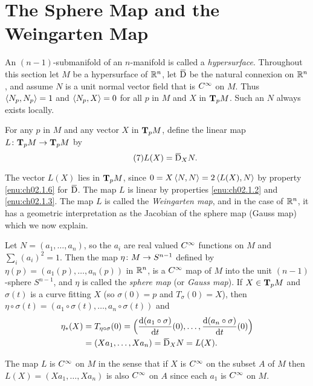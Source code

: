 \documentclass[../main]{subfiles}
\begin{document}

\section{The Sphere Map and the Weingarten Map}\label{ch02:s2}

An $(n-1)$-submanifold of an $n$-manifold is called a \emph{hypersurface}. Throughout this section let $M$ be a hypersurface of $\bR^n$, let $\covariant$ be the natural connexion on $\bR^n$, and assume $N$ is a unit normal vector field that is $\CInfty$ on $M$. Thus $\ip{N_p}{N_p}=1$ and $\ip{N_p}{X}=0$ for all $p$ in $M$ and $X$ in $\tangentspace{M}{p}$. Such an $N$ always exists locally.

For any $p$ in $M$ and any vector $X$ in $\tangentspace{M}{p}$, define the linear map \newline $L\colon \tangentspace{M}{p}\functionMaps \tangentspace{M}{p}$ by 
\begin{equation}\tag{7} \label{enu:ch02.2.7}
    L(X)=\covariant_X N.
\end{equation}

The vector $L(X)$ lies in $\tangentspace{M}{p}$, since $0=X\ip{N}{N}=2\ip{L(X)}{N}$ by property \ref{enu:ch02.1.6} for $\covariant$. The map $L$ is linear by properties \ref{enu:ch02.1.2} and \ref{enu:ch02.1.3}. The map $L$ is called the \emph{Weingarten map}, and in the case of $\bR^n$, it has a geometric interpretation as the Jacobian of the sphere map (Gauss map) which we now explain.

Let $N=(a_1,\dots,a_n)$, so the $a_i$ are real valued $\CInfty$ functions on $M$ and $\sum_i(a_i)^2=1$. Then the map $\eta\colon M\functionMaps S^{n-1}$ defined by $\eta(p)=(a_1(p),\dots,a_n(p))$ in $\bR^n$, is a $\CInfty$ map of $M$ into the unit $(n-1)$-sphere $S^{n-1}$, and $\eta$ is called the \emph{sphere map} (or \emph{Gauss map}). If $X \in \tangentspace{M}{p}$ and $\sigma(t)$ is a curve fitting $X$ (so $\sigma(0)=p$ and $T_{\sigma}(0)=X$), then $\eta\circ\sigma(t)=(a_1\circ\sigma(t),\dots,a_n\circ\sigma(t))$ and
\begin{align*}
    \eta_*(X)&=T_{\eta \circ \sigma }(0) = \Big(\dv{(a_1\circ\sigma)}{t}(0),\dots,\dv{(a_n\circ\sigma)}{t}(0)\Big)\\
    &=(Xa_1,\dots,Xa_n)=\covariant_XN=L(X).
\end{align*}

The map $L$ is $\CInfty$ on $M$ in the sense that if $X$ is $\CInfty$ on the subset $A$ of $M$ then $L(X)=(Xa_1,\dots,Xa_n)$ is also $\CInfty$ on $A$ since each $a_1$ is $\CInfty$ on $M$.
\end{document}
